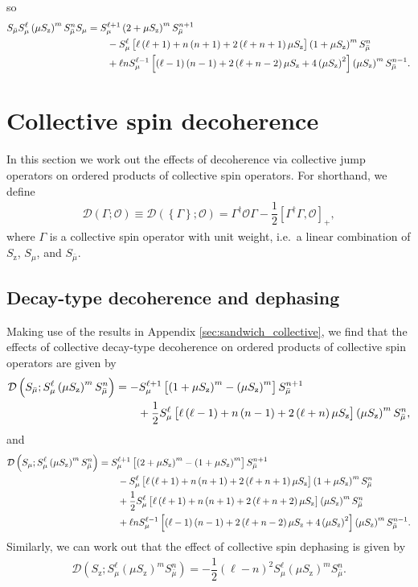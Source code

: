 \documentclass[aps,11pt,notitlepage,nofootinbib,longbibliography]{revtex4-1}
\newcommand{\f}[2]{\dfrac{#1}{#2}} %
\newcommand{\p}[1]{\left(#1\right)} %
\renewcommand{\sp}[1]{\left[#1\right]} %
\renewcommand{\set}[1]{\left\{#1\right\}} %
\newcommand{\D}{\mathcal{D}}
\renewcommand{\O}{\mathcal{O}}
\newcommand{\z}{\text{z}}
\newcommand{\bmu}{{\bar\mu}}
\newcommand{\1}{\mathds{1}}
\begin{document}
so
\begin{align}
  S_\bmu S_\mu^\ell \p{\mu S_\z}^m S_\bmu^n S_\mu
  &= S_\mu^{\ell+1} \p{2+\mu S_\z}^m S_\bmu^{n+1} \notag \\
  &\qquad - S_\mu^\ell
  \sp{\ell\p{\ell+1} + n\p{n+1}+2\p{\ell+n+1}\mu S_\z}
  \p{1+\mu S_\z}^m S_\bmu^n \notag \\
  &\qquad + \ell n S_\mu^{\ell-1}
  \sp{\p{\ell-1}\p{n-1}+2\p{\ell+n-2}\mu S_\z + 4\p{\mu S_\z}^2}
  \p{\mu S_\z}^m S_\bmu^{n-1}.
\end{align}


\section{Collective spin decoherence}
\label{sec:decoherence_collective}

In this section we work out the effects of decoherence via collective
jump operators on ordered products of collective spin operators.  For
shorthand, we define
\begin{align}
  \D\p{\Gamma;\O}
  \equiv \D\p{\set{\Gamma};\O}
  = \Gamma^\dag \O \Gamma - \f12\sp{\Gamma^\dag \Gamma, \O}_+,
\end{align}
where $\Gamma$ is a collective spin operator with unit weight, i.e.~a
linear combination of $S_\z$, $S_\mu$, and $S_\bmu$.

\subsection{Decay-type decoherence and dephasing}
\label{sec:decay_dephasing_collective}

Making use of the results in Appendix \ref{sec:sandwich_collective},
we find that the effects of collective decay-type decoherence on
ordered products of collective spin operators are given by
\begin{align}
  \D\p{S_\bmu; S_\mu^\ell \p{\mu S_\z}^m S_\bmu^n}
  &= -S_\mu^{\ell+1} \sp{\p{1+\mu S_\z}^m - \p{\mu S_\z}^m}
  S_\bmu^{n+1} \notag \\
  &\qquad + \f12 S_\mu^\ell \sp{\ell\p{\ell-1} + n\p{n-1}
    + 2\p{\ell+n}\mu S_\z} \p{\mu S_\z}^m S_\bmu^n,
\end{align}
and
\begin{align}
  \D\p{S_\mu; S_\mu^\ell \p{\mu S_\z}^m S_\bmu^n}
  &= S_\mu^{\ell+1} \sp{\p{2+\mu S_\z}^m-\p{1+\mu S_\z}^m}
  S_\bmu^{n+1} \notag \\
  &\qquad - S_\mu^\ell
  \sp{\ell\p{\ell+1} + n\p{n+1}+2\p{\ell+n+1}\mu S_\z}
  \p{1+\mu S_\z}^m S_\bmu^n \notag \\
  &\qquad + \f12 S_\mu^\ell
  \sp{\ell\p{\ell+1} + n\p{n+1}+2\p{\ell+n+2}\mu S_\z}
  \p{\mu S_\z}^m S_\bmu^n \notag \\
  &\qquad + \ell n S_\mu^{\ell-1}
  \sp{\p{\ell-1}\p{n-1}+2\p{\ell+n-2}\mu S_\z + 4\p{\mu S_\z}^2}
  \p{\mu S_\z}^m S_\bmu^{n-1}.
\end{align}
Similarly, we can work out that the effect of collective spin
dephasing is given by
\begin{align}
  \D\p{S_\z; S_\mu^\ell \p{\mu S_\z}^m S_\bmu^n}
  = -\f12 \p{\ell-n}^2 S_\mu^\ell \p{\mu S_\z}^m S_\bmu^n.
\end{align}
\end{document}
